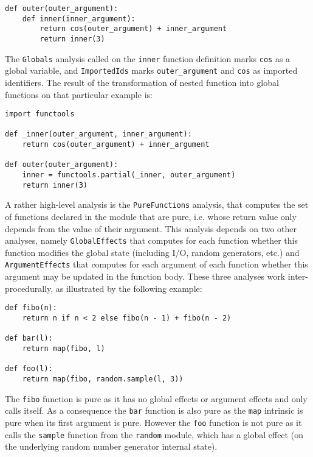 \documentclass[10pt, onecolumn, preprint]{sigplanconf}
\begin{document}
\begin{lstlisting}
def outer(outer_argument):
    def inner(inner_argument):
        return cos(outer_argument) + inner_argument
        return inner(3)
\end{lstlisting}

The \texttt{Globals} analysis called on the \texttt{inner} function definition
marks \texttt{cos} as a global variable, and \texttt{ImportedIds} marks
\texttt{outer\_argument} and \texttt{cos} as imported identifiers. The result
of the transformation of nested function into global functions on that
particular example is:

\begin{lstlisting}
import functools

def _inner(outer_argument, inner_argument):
    return cos(outer_argument) + inner_argument

def outer(outer_argument):
    inner = functools.partial(_inner, outer_argument)
    return inner(3)
\end{lstlisting}

A rather high-level analysis is the \texttt{PureFunctions} analysis, that computes the
set of functions declared in the module that are pure, i.e. whose return value
only depends from the value of their argument. This analysis depends on two
other analyses, namely \texttt{GlobalEffects} that computes for each function whether
this function modifies the global state (including I/O, random generators, etc.)
and \texttt{ArgumentEffects} that computes for each argument of each function whether
this argument may be updated in the function body. These three analyses work
inter-procedurally, as illustrated by the following example:

\begin{lstlisting}
def fibo(n):
    return n if n < 2 else fibo(n - 1) + fibo(n - 2)

def bar(l):
    return map(fibo, l)

def foo(l):
    return map(fibo, random.sample(l, 3))
\end{lstlisting}

The \texttt{fibo} function is pure as it has no global effects or argument effects and
only calls itself. As a consequence the \texttt{bar} function is also pure as the
\texttt{map} intrinsic is pure when its first argument is pure. However the \texttt{foo}
function is not pure as it calls the \texttt{sample} function from the \texttt{random}
module, which has a global effect (on the underlying random number generator
internal state).
\end{document}
